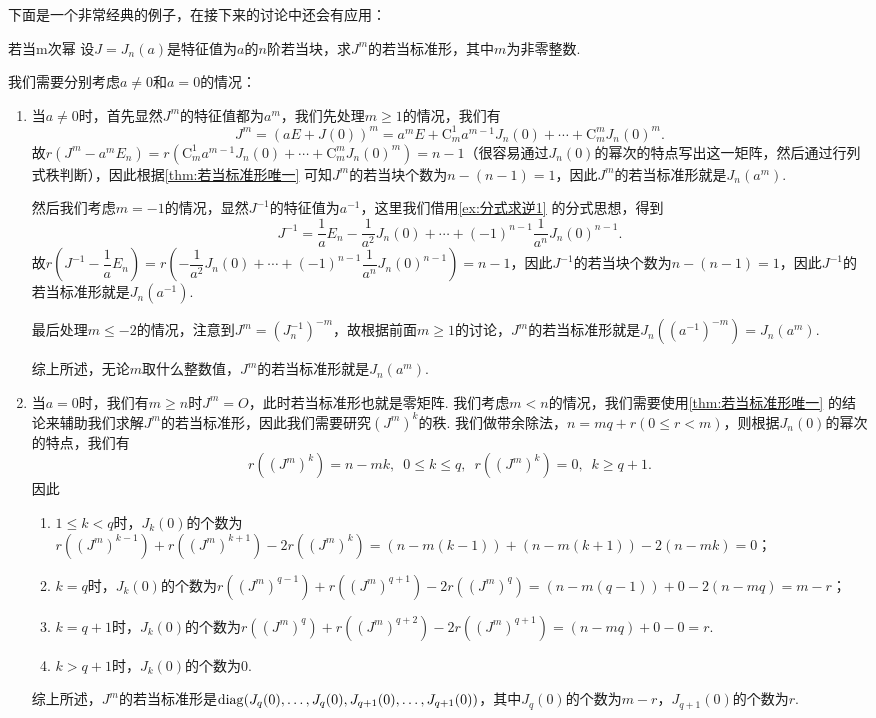 下面是一个非常经典的例子，在接下来的讨论中还会有应用：
\begin{example}{}{若当m次幂}
    设$J=J_n(a)$是特征值为$a$的$n$阶若当块，求$J^m$的若当标准形，其中$m$为非零整数.
\end{example}
\begin{solution}
    我们需要分别考虑$a\neq 0$和$a=0$的情况：
    \begin{enumerate}
        \item 当$a\neq 0$时，首先显然$J^m$的特征值都为$a^m$，我们先处理$m\geqslant 1$的情况，我们有
              \[J^m=(aE+J(0))^m=a^mE+\mathrm{C}_m^1a^{m-1}J_n(0)+\cdots+\mathrm{C}_m^mJ_n(0)^m.\]
              故$r(J^m-a^mE_n)=r(\mathrm{C}_m^1a^{m-1}J_n(0)+\cdots+\mathrm{C}_m^mJ_n(0)^m)=n-1$（很容易通过$J_n(0)$的幂次的特点写出这一矩阵，然后通过行列式秩判断），因此根据\autoref{thm:若当标准形唯一} 可知$J^m$的若当块个数为$n-(n-1)=1$，因此$J^m$的若当标准形就是$J_n(a^m)$.

              然后我们考虑$m=-1$的情况，显然$J^{-1}$的特征值为$a^{-1}$，这里我们借用\autoref{ex:分式求逆1} 的分式思想，得到
              \[J^{-1}=\dfrac{1}{a}E_n-\dfrac{1}{a^2}J_n(0)+\cdots+(-1)^{n-1}\dfrac{1}{a^n}J_n(0)^{n-1}.\]
              故$r(J^{-1}-\dfrac{1}{a}E_n)=r(-\dfrac{1}{a^2}J_n(0)+\cdots+(-1)^{n-1}\dfrac{1}{a^n}J_n(0)^{n-1})=n-1$，因此$J^{-1}$的若当块个数为$n-(n-1)=1$，因此$J^{-1}$的若当标准形就是$J_n(a^{-1})$.

              最后处理$m\leqslant -2$的情况，注意到$J^m=(J_n^{-1})^{-m}$，故根据前面$m\geqslant 1$的讨论，$J^m$的若当标准形就是$J_n((a^{-1})^{-m})=J_n(a^m)$.

              综上所述，无论$m$取什么整数值，$J^m$的若当标准形就是$J_n(a^m)$.

        \item 当$a=0$时，我们有$m\geqslant n$时$J^m=O$，此时若当标准形也就是零矩阵. 我们考虑$m<n$的情况，我们需要使用\autoref{thm:若当标准形唯一} 的结论来辅助我们求解$J^m$的若当标准形，因此我们需要研究$(J^m)^k$的秩. 我们做带余除法，$n=mq+r(0\leqslant r<m)$，则根据$J_n(0)$的幂次的特点，我们有
              \[r((J^m)^k)=n-mk,\enspace 0\leqslant k\leqslant q,\enspace r((J^m)^k)=0,\enspace k\geqslant q+1.\]
              因此
              \begin{enumerate}
                  \item $1\leqslant k<q$时，$J_k(0)$的个数为$r((J^m)^{k-1})+r((J^m)^{k+1})-2r((J^m)^k)=(n-m(k-1))+(n-m(k+1))-2(n-mk)=0$；
                  \item $k=q$时，$J_k(0)$的个数为$r((J^m)^{q-1})+r((J^m)^{q+1})-2r((J^m)^q)=(n-m(q-1))+0-2(n-mq)=m-r$；
                  \item $k=q+1$时，$J_k(0)$的个数为$r((J^m)^q)+r((J^m)^{q+2})-2r((J^m)^{q+1})=(n-mq)+0-0=r$.
                  \item $k>q+1$时，$J_k(0)$的个数为0.
              \end{enumerate}
              综上所述，$J^m$的若当标准形是$\operatorname{diag}(J_q(0),\ldots,J_q(0),J_{q+1}(0),\ldots,J_{q+1}(0))$，其中$J_q(0)$的个数为$m-r$，$J_{q+1}(0)$的个数为$r$.
    \end{enumerate}
\end{solution}

